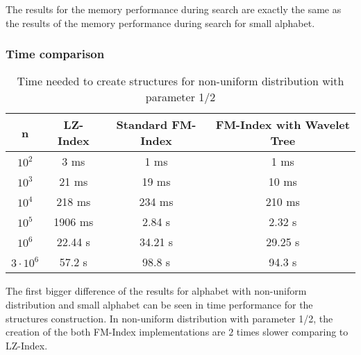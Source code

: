 The results for the memory performance during search are exactly the same as the results of the memory performance during search for small alphabet.


\subsubsection{Time comparison}

\begin{table}[H]
\begin{center}
\caption{Time needed to create structures for non-uniform distribution with parameter 1/2}
\begin{tabular}{|c|c|c|c|}
\hline
\rowcolor[HTML]{C0C0C0}
n & LZ-Index & Standard FM-Index & FM-Index with Wavelet Tree \\ \hline
$10^{2}$ & 3 ms & 1 ms & 1 ms \\ \hline
$10^{3}$ & 21 ms & 19 ms & 10 ms \\ \hline
$10^{4}$ & 218 ms & 234 ms & 210 ms \\ \hline
$10^{5}$ & 1906 ms & 2.84 s & 2.32 s \\ \hline
$10^{6}$ & 22.44 s & 34.21 s & 29.25 s \\ \hline
$3 \cdot 10^{6}$ & 57.2 s & 98.8 s & 94.3 s \\ \hline
\end{tabular}
\end{center}
\end{table}
The first bigger difference of the results for alphabet with non-uniform distribution and small alphabet can be seen in time performance for the structures construction. In non-uniform distribution with parameter 1/2, the creation of the both FM-Index implementations are $2$ times slower comparing to LZ-Index.

